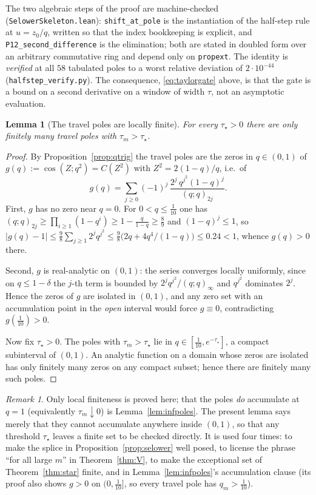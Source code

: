 \documentclass[11pt]{article}
\theoremstyle{plain}
\newtheorem{lemma}[theorem]{Lemma}
\theoremstyle{definition}
\theoremstyle{remark}
\newtheorem{remark}[theorem]{Remark}
\begin{document}
\noindent The two algebraic steps of the proof are machine-checked
(\texttt{SelowerSkeleton.lean}): \texttt{shift\_at\_pole} is the instantiation of the half-step rule
at $u=z_0/q$, written so that the index bookkeeping is explicit, and
\texttt{P12\_second\_difference} is the elimination; both are stated in doubled form over an
arbitrary commutative ring and depend only on \texttt{propext}. The identity is
\emph{verified} at all $58$ tabulated poles to a worst relative deviation of
$2\cdot10^{-44}$ (\texttt{halfstep\_verify.py}). The consequence, \eqref{eq:taylorgate} above, is that the gate is a bound on a second
derivative on a window of width $\tau$, not an asymptotic evaluation.

\begin{lemma}[The travel poles are locally finite]\label{lem:polefinite}
For every $\tau_\star>0$ there are only finitely many travel poles with $\tau_m>\tau_\star$.
\end{lemma}

\begin{proof}
By Proposition~\ref{prop:qtrig} the travel poles are the zeros in $q\in(0,1)$ of
$g(q):=\cos(Z;q^2)=C(Z^2)$ with $Z^2=2(1-q)/q$, i.e.\ of
\[
 g(q)=\sum_{j\ge0}(-1)^j\,\frac{2^j\,q^{j^2}(1-q)^j}{(q;q)_{2j}} .
\]
First, $g$ has no zero near $q=0$. For $0<q\le\tfrac1{10}$ one has
$(q;q)_{2j}\ge\prod_{i\ge1}(1-q^i)\ge1-\tfrac q{1-q}\ge\tfrac89$ and $(1-q)^j\le1$, so
$|g(q)-1|\le\tfrac98\sum_{j\ge1}2^jq^{j^2}\le\tfrac98\bigl(2q+4q^4/(1-q)\bigr)\le0.24<1$, whence
$g(q)>0$ there.

Second, $g$ is real-analytic on $(0,1)$: the series converges locally uniformly, since on
$q\le1-\delta$ the $j$-th term is bounded by $2^jq^{j^2}/(q;q)_\infty$ and $q^{j^2}$ dominates $2^j$.
Hence the zeros of $g$ are isolated in $(0,1)$, and any zero set with an accumulation point in the
\emph{open} interval would force $g\equiv0$, contradicting $g(\tfrac1{10})>0$.

Now fix $\tau_\star>0$. The poles with $\tau_m>\tau_\star$ lie in $q\in[\tfrac1{10},e^{-\tau_\star}]$,
a compact subinterval of $(0,1)$. An analytic function on a domain whose zeros are isolated has only
finitely many zeros on any compact subset; hence there are finitely many such poles.
\end{proof}

\begin{remark}
Only local finiteness is proved here; that the poles \emph{do} accumulate at $q=1$
(equivalently $\tau_m\downarrow0$) is Lemma~\ref{lem:infpoles}. The present lemma says merely that
they cannot accumulate anywhere inside $(0,1)$, so that any threshold $\tau_\star$ leaves a finite
set to be checked directly. It is used four times: to make the splice in
Proposition~\ref{prop:selower} well posed, to license the phrase ``for all large $m$'' in
Theorem~\ref{thm:V}, to make the exceptional set of Theorem~\ref{thm:star} finite, and in
Lemma~\ref{lem:infpoles}'s accumulation clause (its proof also shows $g>0$ on $(0,\tfrac1{10}]$,
so every travel pole has $q_m>\tfrac1{10}$).
\end{remark}
\end{document}
